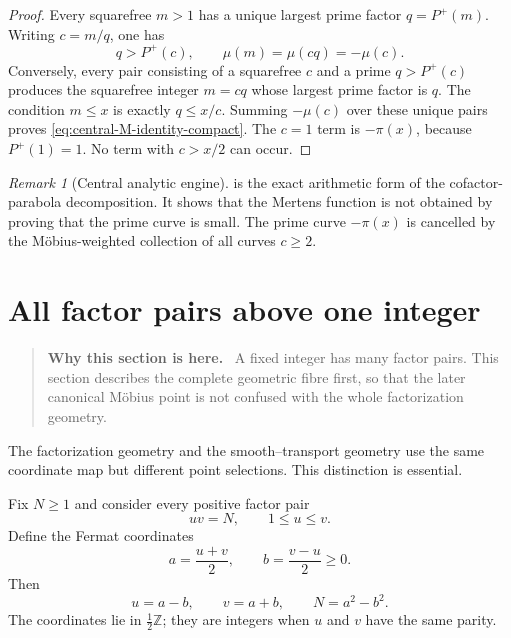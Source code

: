 \documentclass[11pt]{article}
\theoremstyle{definition}
\theoremstyle{remark}
\newtheorem{remark}[theorem]{Remark}
\newcommand{\Pplus}{P^{+}}
\newcommand{\1}{\mathbf{1}}
\newcommand{\Z}{\mathbb{Z}}
\newenvironment{motivation}
  {\begin{quote}\small\color{ovvogray}\textbf{Why this section is here.}\ }
  {\end{quote}}
\begin{document}
\begin{proof}
Every squarefree $m>1$ has a unique largest prime factor
$q=\Pplus(m)$.  Writing $c=m/q$, one has
\[
 q>\Pplus(c),
 \qquad
 \mu(m)=\mu(cq)=-\mu(c).
\]
Conversely, every pair consisting of a squarefree $c$ and a prime
$q>\Pplus(c)$ produces the squarefree integer $m=cq$ whose largest
prime factor is $q$.  The condition $m\le x$ is exactly $q\le x/c$.
Summing $-\mu(c)$ over these unique pairs proves
\cref{eq:central-M-identity-compact}.  The $c=1$ term is
$-\pi(x)$, because $\Pplus(1)=1$.  No term with $c>x/2$ can occur.
\end{proof}

\begin{remark}[Central analytic engine]
 is the exact arithmetic form of the
cofactor-parabola decomposition.  It shows that the Mertens function is
not obtained by proving that the prime curve is small.  The prime curve
$-\pi(x)$ is cancelled by the M\"obius-weighted collection of all
curves $c\ge2$.
\end{remark}


\section{All factor pairs above one integer}
\label{sec:full-fibre}

\begin{motivation}
A fixed integer has many factor pairs.  This section describes the complete geometric fibre first, so that the later canonical M\"obius point is not confused with the whole factorization geometry.
\end{motivation}

The factorization geometry and the smooth--transport geometry use the same coordinate map but different point selections.  This distinction is essential.

Fix $N\ge1$ and consider every positive factor pair
\begin{equation}
 uv=N,
 \qquad
 1\le u\le v.
 \label{eq:factor-pair}
\end{equation}
Define the Fermat coordinates
\begin{equation}
 a=\frac{u+v}{2},
 \qquad
 b=\frac{v-u}{2}\ge0.
 \label{eq:full-Fermat}
\end{equation}
Then
\begin{equation}
 u=a-b,
 \qquad
 v=a+b,
 \qquad
 N=a^2-b^2.
 \label{eq:full-recovery}
\end{equation}
The coordinates lie in $\frac12\Z$; they are integers when $u$ and $v$ have the same parity.
\end{document}

